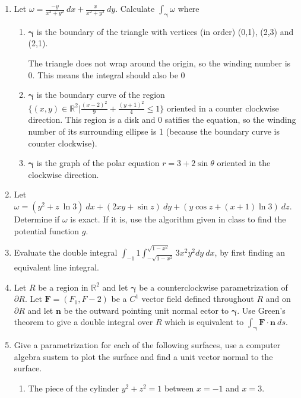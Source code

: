 \documentclass{article}
\newcommand{\gam}{\boldsymbol{\gamma}}
\begin{document}
\thispagestyle{fancy}

\begin{enumerate}
    \item Let $\displaystyle \omega = \frac{-y}{x^2+y^2}\ dx + \frac{x}{x^2+y^2}\ dy$. Calculate $\displaystyle \int_{\gam} \omega$ where
    \begin{enumerate}
        \item $\gam$ is the boundary of the triangle with vertices (in order) (0,1), (2,3) and (2,1).

        The triangle does not wrap around the origin, so the winding number is 0. This means the integral should also be 0
        \item $\gam$ is the boundary curve of the region $\displaystyle \Bigg\{(x,y) \in \mathbb{R}^2 \Bigg|\frac{(x-2)^2}{9} + \frac{(y+1)^2}{4} \leq 1 \Bigg\}$ oriented in a counter clockwise direction.
        This region is a disk and 0 satifies the equation, so the winding number of its surrounding ellipse is 1 (because the boundary curve is counter clockwise).
        \item $\gam$ is the graph of the polar equation $r = 3 + 2 \sin \theta$ oriented in the clockwise direction.
    \end{enumerate}
    \newpage
    \item Let $\omega = (y^2 + z \ \ln 3)\ dx + (2xy + \sin z)\ dy + (y \cos z + (x + 1) \ln 3)\ dz$. Determine if $\omega$ is exact. If it is, use the algorithm given in class to find the potential function $g$.
    \newpage
    \item Evaluate the double integral $\displaystyle \int_{-1}{1} \int_{-\sqrt{1-x^2}}^{\sqrt{1-x^2}}3x^2y^2dy\ dx$, by first finding an equivalent line integral.
    \newpage
    \item Let $R$ be a region in $\mathbb{R}^2$ and let $\gam$ be a counterclockwise parametrization of $\partial R$. Let $\boldsymbol F = (F_1,F-2)$ be a $C^1$ vector field defined throughout $R$ and on $\partial R$ and let $\boldsymbol n$ be the outward pointing unit normal ector to $\gam$. Use Green's theorem to give a double integral over $R$ which is equivalent to $\displaystyle \int_{\gam} \boldsymbol F \cdot \boldsymbol n \ ds$.
    \newpage
    \item Give a parametrization for each of the following surfaces, use a computer algebra sustem to plot the surface and find a unit vector normal to the surface.
    \begin{enumerate}
        \item The piece of the cylinder $y^2 + z^2 = 1$ between $x = -1$ and $x = 3$.

\end{enumerate}
\end{enumerate}
\end{document}
